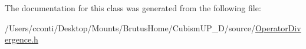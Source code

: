 The documentation for this class was generated from the following file\+:\begin{DoxyCompactItemize}
\item 
/\+Users/cconti/\+Desktop/\+Mounts/\+Brutus\+Home/\+Cubism\+U\+P\+\_\+D/source/\hyperlink{_operator_divergence_8h}{Operator\+Divergence.\+h}\end{DoxyCompactItemize}
